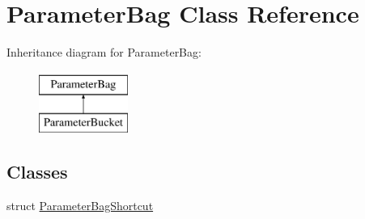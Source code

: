 \hypertarget{classParameterBag}{
\section{ParameterBag Class Reference}
\label{classParameterBag}
}
Inheritance diagram for ParameterBag:\begin{figure}[H]
\begin{center}
\leavevmode
\includegraphics[height=2.000000cm]{classParameterBag}
\end{center}
\end{figure}
\subsection*{Classes}
\begin{DoxyCompactItemize}
\item 
struct \hyperlink{structParameterBag_1_1ParameterBagShortcut}{ParameterBagShortcut}
\end{DoxyCompactItemize}
